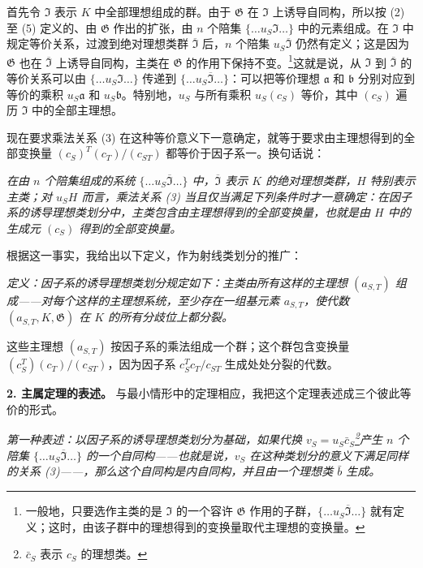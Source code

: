 \documentclass[11pt]{article}
\begin{document}
首先令 \(\mathfrak I\) 表示 \(K\) 中全部理想组成的群。由于 \(\mathfrak G\) 在 \(\mathfrak I\) 上诱导自同构，所以按 (2) 至 (5) 定义的、由 \(\mathfrak G\) 作出的扩张，由 \(n\) 个陪集 \(\{\ldots u_S\mathfrak I\ldots\}\) 中的元素组成。在 \(\mathfrak I\) 中规定等价关系，过渡到绝对理想类群 \(\overline{\mathfrak I}\) 后，\(n\) 个陪集 \(u_S\overline{\mathfrak I}\) 仍然有定义；这是因为 \(\mathfrak G\) 也在 \(\overline{\mathfrak I}\) 上诱导自同构，主类在 \(\mathfrak G\) 的作用下保持不变。\footnote{一般地，只要选作主类的是 \(\mathfrak I\) 的一个容许 \(\mathfrak G\) 作用的子群，\(\{\ldots u_S\overline{\mathfrak I}\ldots\}\) 就有定义；这时，由该子群中的理想得到的变换量取代主理想的变换量。}这就是说，从 \(\mathfrak I\) 到 \(\overline{\mathfrak I}\) 的等价关系可以由 \(\{\ldots u_S\mathfrak I\ldots\}\) 传递到 \(\{\ldots u_S\overline{\mathfrak I}\ldots\}\)：可以把等价理想 \(\mathfrak a\) 和 \(\mathfrak b\) 分别对应到等价的乘积 \(u_S\mathfrak a\) 和 \(u_S\mathfrak b\)。特别地，\(u_S\) 与所有乘积 \(u_S(c_S)\) 等价，其中 \((c_S)\) 遍历 \(\mathfrak I\) 中的全部主理想。

现在要求乘法关系 (3) 在这种等价意义下一意确定，就等于要求由主理想得到的全部变换量 \((c_S)^T(c_T)/(c_{ST})\) 都等价于因子系一。换句话说：

\emph{在由 \(n\) 个陪集组成的系统 \(\{\ldots u_S\overline{\mathfrak I}\ldots\}\) 中，\(\overline{\mathfrak I}\) 表示 \(K\) 的绝对理想类群，\(H\) 特别表示主类；对 \(u_SH\) 而言，乘法关系 (3) 当且仅当满足下列条件时才一意确定：在因子系的诱导理想类划分中，主类包含由主理想得到的全部变换量，也就是由 \(H\) 中的生成元 \((c_S)\) 得到的全部变换量。}

根据这一事实，我给出以下定义，作为射线类划分的推广：

\emph{定义：因子系的诱导理想类划分规定如下：主类由所有这样的主理想 \((a_{S,T})\) 组成——对每个这样的主理想系统，至少存在一组基元素 \(a_{S,T}\)，使代数 \((a_{S,T},K,\mathfrak G)\) 在 \(K\) 的所有分歧位上都分裂。}

这些主理想 \((a_{S,T})\) 按因子系的乘法组成一个群；这个群包含变换量 \((c_S^T)(c_T)/(c_{ST})\)，因为因子系 \(c_S^Tc_T/c_{ST}\) 生成处处分裂的代数。

\noindent\textbf{2. 主属定理的表述。} 与最小情形中的定理相应，我把这个定理表述成三个彼此等价的形式。

\emph{第一种表述：以因子系的诱导理想类划分为基础，如果代换 \(v_S=u_S\bar c_S\)\footnote{\(\bar c_S\) 表示 \(c_S\) 的理想类。}产生 \(n\) 个陪集 \(\{\ldots u_S\overline{\mathfrak I}\ldots\}\) 的一个自同构——也就是说，\(v_S\) 在这种类划分的意义下满足同样的关系 (3)——，那么这个自同构是内自同构，并且由一个理想类 \(\bar b\) 生成。}
\end{document}
